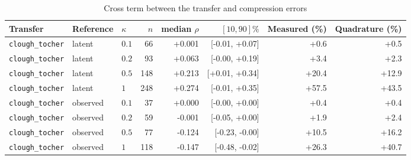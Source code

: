 \begin{table}[t]
\centering
\caption{Cross term between the transfer and compression errors}
\label{tab:cross_term}
\footnotesize
\begin{tabular}{@{}lllrrrrr@{}}
\toprule
Transfer & Reference & $\kappa$ & $n$ & median $\rho$ & $[10,90]\%$ & Measured (\%) & Quadrature (\%) \\
\midrule
\texttt{clough\_tocher} & latent & $0.1$ & 66 & +0.001 & [-0.01, +0.07] & +0.6 & +0.5 \\
\texttt{clough\_tocher} & latent & $0.2$ & 93 & +0.063 & [-0.00, +0.19] & +3.4 & +2.3 \\
\texttt{clough\_tocher} & latent & $0.5$ & 148 & +0.213 & [+0.01, +0.34] & +20.4 & +12.9 \\
\texttt{clough\_tocher} & latent & $1$ & 248 & +0.274 & [-0.01, +0.35] & +57.5 & +43.5 \\
\texttt{clough\_tocher} & observed & $0.1$ & 37 & +0.000 & [-0.00, +0.00] & +0.4 & +0.4 \\
\texttt{clough\_tocher} & observed & $0.2$ & 59 & -0.001 & [-0.05, +0.00] & +1.9 & +2.4 \\
\texttt{clough\_tocher} & observed & $0.5$ & 77 & -0.124 & [-0.23, -0.00] & +10.5 & +16.2 \\
\texttt{clough\_tocher} & observed & $1$ & 118 & -0.147 & [-0.48, -0.02] & +26.3 & +40.7 \\
\bottomrule
\end{tabular}

\end{table}

